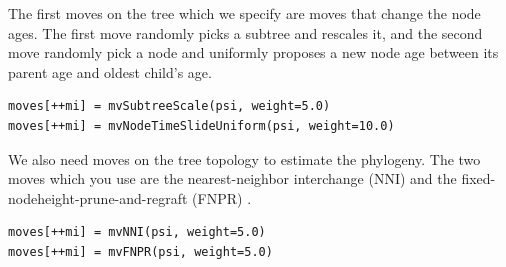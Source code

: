 The first moves on the tree which we specify are moves that change the node ages. The first move randomly picks a subtree and rescales it, and the second move randomly pick a node and uniformly proposes a new node age between its parent age and oldest child's age.
{\tt \small \begin{snugshade*}
\begin{lstlisting}
moves[++mi] = mvSubtreeScale(psi, weight=5.0)
moves[++mi] = mvNodeTimeSlideUniform(psi, weight=10.0)
\end{lstlisting}
\end{snugshade*}}

We also need moves on the tree topology to estimate the phylogeny. The two moves which you use are the nearest-neighbor interchange (NNI) and the fixed-nodeheight-prune-and-regraft (FNPR) \citep{Hohna2012}.
{\tt \small \begin{snugshade*}
\begin{lstlisting}
moves[++mi] = mvNNI(psi, weight=5.0)
moves[++mi] = mvFNPR(psi, weight=5.0)\end{lstlisting}
\end{snugshade*}}


